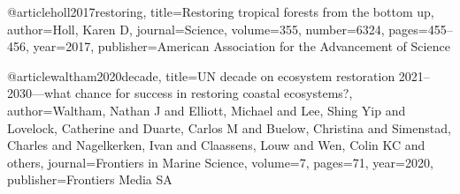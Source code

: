 
@article{holl2017restoring,
  title={Restoring tropical forests from the bottom up},
  author={Holl, Karen D},
  journal={Science},
  volume={355},
  number={6324},
  pages={455--456},
  year={2017},
  publisher={American Association for the Advancement of Science}
}

@article{waltham2020decade,
  title={UN decade on ecosystem restoration 2021--2030—what chance for success in restoring coastal ecosystems?},
  author={Waltham, Nathan J and Elliott, Michael and Lee, Shing Yip and Lovelock, Catherine and Duarte, Carlos M and Buelow, Christina and Simenstad, Charles and Nagelkerken, Ivan and Claassens, Louw and Wen, Colin KC and others},
  journal={Frontiers in Marine Science},
  volume={7},
  pages={71},
  year={2020},
  publisher={Frontiers Media SA}
}